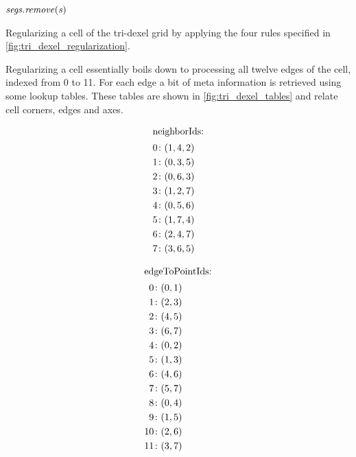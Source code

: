\begin{algorithm}
\begin{algorithmic}[1]
						\State $\mathit{segs}.\mathit{remove}(\mathit{s})$
					\EndIf
				\EndFor
			\EndFor
		\EndFunction
	\end{algorithmic}
	\caption{
		Regularizing a cell of the tri-dexel grid by applying the four rules specified in \cref{fig:tri_dexel_regularization}.
	}
	\label{alg:tri_dexel_regularization}
\end{algorithm}
%
Regularizing a cell essentially boils down to processing all twelve edges of the cell, indexed from 0 to 11.
For each edge a bit of meta information is retrieved using some lookup tables.
These tables are shown in \cref{fig:tri_dexel_tables} and relate cell corners, edges and axes.
%
\begin{figure}
	\centering
	\begin{subfigure}[t]{0.25\textwidth}
		\centering
		\begin{align*}
			\shortintertext{neighborIds:}
			0 &\colon (1, 4, 2) \\
			1 &\colon (0, 3, 5) \\
			2 &\colon (0, 6, 3) \\
			3 &\colon (1, 2, 7) \\
			4 &\colon (0, 5, 6) \\
			5 &\colon (1, 7, 4) \\
			6 &\colon (2, 4, 7) \\
			7 &\colon (3, 6, 5)
		\end{align*}
	\end{subfigure}%
	\begin{subfigure}[t]{0.25\textwidth}
		\centering
		\begin{align*}
			\shortintertext{edgeToPointIds:}
			 0 &\colon (0, 1) \\
			 1 &\colon (2, 3) \\
			 2 &\colon (4, 5) \\
			 3 &\colon (6, 7) \\
			 4 &\colon (0, 2) \\
			 5 &\colon (1, 3) \\
			 6 &\colon (4, 6) \\
			 7 &\colon (5, 7) \\
			 8 &\colon (0, 4) \\
			 9 &\colon (1, 5) \\
			10 &\colon (2, 6) \\
			11 &\colon (3, 7)

\end{align*}
\end{subfigure}
\end{figure}
